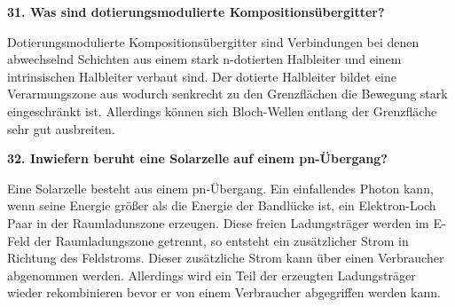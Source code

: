 \noindent\textbf{31. Was sind dotierungsmodulierte Kompositionsübergitter?}\\
\begin{addmargin}[25pt]{0pt}
Dotierungsmodulierte Kompositionsübergitter sind Verbindungen bei denen abwechselnd Schichten aus einem stark n-dotierten Halbleiter und einem intrinsischen Halbleiter verbaut sind. Der dotierte Halbleiter bildet eine Verarmungszone aus wodurch senkrecht zu den Grenzflächen die Bewegung stark eingeschränkt ist. Allerdings können sich Bloch-Wellen entlang der Grenzfläche sehr gut ausbreiten.  \\
\end{addmargin}

\noindent\textbf{32. Inwiefern beruht eine Solarzelle auf einem pn-Übergang?}\\
\begin{addmargin}[25pt]{0pt}
Eine Solarzelle besteht aus einem pn-Übergang. Ein einfallendes Photon kann, wenn seine Energie größer als die Energie der Bandlücke ist, ein Elektron-Loch Paar in der Raumladunszone erzeugen. Diese freien Ladungsträger werden im E-Feld der Raumladungszone getrennt, so entsteht ein zusätzlicher Strom in Richtung des Feldstroms. Dieser zusätzliche Strom kann über einen Verbraucher abgenommen werden. Allerdings wird ein Teil der erzeugten Ladungsträger wieder rekombinieren bevor er von einem Verbraucher abgegriffen werden kann.\\
\end{addmargin}

